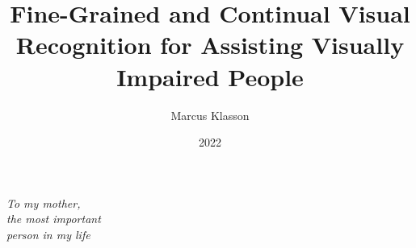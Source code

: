 \documentclass[electronic, oldfontcommands]{kthesis}
\newlength\longest %
\begin{document}
	
\setlength{\abovedisplayskip}{3pt} 
\setlength{\belowdisplayskip}{3pt}
	
\newcommand*{\BuildingFromMainFile}{}
	
\title{Fine-Grained and Continual Visual Recognition for Assisting Visually Impaired People}
\author{Marcus Klasson}
\date{2022}
\address{Division of Robotics, Perception, and Learning \\ School of Electrical Engineering and Computer Science\\ KTH Royal Institute of Technology \\ SE-100 44 Stockholm, Sweden}
	
\maketitle


\clearpage

\thispagestyle{empty}
\null\vfill %

\settowidth{}
\begin{center}
\parbox{\longest}{%
	\begin{center}
	\huge\itshape To my mother,\\
	the most important\\
	person in my life\par\bigskip 
	\end{center}
}
\end{center}

\vfill\vfill

\clearpage

\thispagestyle{empty}
\null\vfill 
\clearpage
\end{document}
